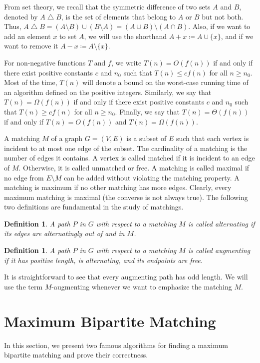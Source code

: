 \documentclass[12pt]{report}
\newtheorem{ddef}[base]{Definition}
\numberwithin{algorithm}{chapter}
\begin{document}
	From set theory, we recall that the symmetric difference of two sets $A$ and $B$, denoted by $A\bigtriangleup B$, is the set of elements that belong to $A$ or $B$ but not both. Thus, $A\bigtriangleup B = (A \setminus B) \cup (B \setminus A) = (A \cup B) \setminus (A \cap B)$. Also, if we want to add an element $x$ to set $A$, we will use the shorthand $A + x \coloneqq A \cup \{x\}$, and if we want to remove it $A - x \coloneqq A \setminus \{x\}$.

	For non-negative functions $T$ and $f$, we write $T(n) = O(f(n))$ if and only if there exist positive constants $c$ and $n_{0}$ such that $T(n) \leq c f(n)$ for all $n \geq n_{0}$. Most of the time, $T(n)$ will denote a bound on the worst-case running time of an algorithm defined on the positive integers. Similarly, we say that $T(n) = \Omega(f(n))$ if and only if there exist positive constants $c$ and $n_{0}$ such that $T(n) \geq cf(n)$ for all $n \geq n_{0}$. Finally, we say that $T(n) = \Theta(f(n))$ if and only if $T(n) = O(f(n))$ and $T(n) = \Omega(f(n))$.

	A matching $M$ of a graph $G = (V,E)$ is a subset of $E$ such that each vertex is incident to at most one edge of the subset. The cardinality of a matching is the number of edges it contains. A vertex is called matched if it is incident to an edge of $M$. Otherwise, it is called unmatched or free. A matching is called maximal if no edge from $E \setminus M$ can be added without violating the matching property. A matching is maximum if no other matching has more edges. Clearly, every maximum matching is maximal (the converse is not always true). The following two definitions are fundamental in the study of matchings.
	
	\begin{ddef}
		A path $P$ in $G$ with respect to a matching $M$ is called alternating if its edges are alternatingly out of and in $M$.
	\end{ddef}
	
	\begin{ddef}
		A path $P$ in $G$ with respect to a matching $M$ is called augmenting if it has positive length, is alternating, and its endpoints are free.
	\end{ddef}
	
	It is straightforward to see that every augmenting path has odd length. We will use the term $M$-augmenting whenever we want to emphasize the matching $M$.
	
\section{Maximum Bipartite Matching} \label{2.2}
	In this section, we present two famous algorithms for finding a maximum bipartite matching and prove their correctness.
\end{document}
